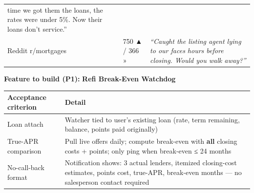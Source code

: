 \documentclass[
  10pt,
]{article}
\let\origtexttt\texttt
\renewcommand{\texttt}[1]{\origtexttt{\seqsplit{#1}}}
\begin{document}
\begin{longtable}[]{@{}llll@{}}
\begin{minipage}[t]{0.44\columnwidth}
{time we got them the loans, the rates were under 5\%. Now their loans don't service.''}\strut
\end{minipage}\tabularnewline
\begin{minipage}[t]{0.20\columnwidth}\raggedright
Reddit r/mortgages\strut
\end{minipage} & \begin{minipage}[t]{0.14\columnwidth}\raggedright
\texttt{1so6v60}\strut
\end{minipage} & \begin{minipage}[t]{0.10\columnwidth}\raggedright
750 ▲ / 366 »\strut
\end{minipage} & \begin{minipage}[t]{0.44\columnwidth}\raggedright
\emph{``Caught the listing agent lying to our faces hours before closing. Would you walk
away?''}\strut
\end{minipage}\tabularnewline
\bottomrule
\end{longtable}

\textbf{Feature to build (P1):} \textbf{Refi Break-Even Watchdog}

\begin{longtable}[]{@{}ll@{}}
\toprule
\begin{minipage}[b]{0.47\columnwidth}\raggedright
Acceptance criterion\strut
\end{minipage} & \begin{minipage}[b]{0.47\columnwidth}\raggedright
Detail\strut
\end{minipage}\tabularnewline
\midrule
\endhead
\begin{minipage}[t]{0.47\columnwidth}\raggedright
Loan attach\strut
\end{minipage} & \begin{minipage}[t]{0.47\columnwidth}\raggedright
Watcher tied to user's existing loan (rate, term remaining, balance, points paid originally)\strut
\end{minipage}\tabularnewline
\begin{minipage}[t]{0.47\columnwidth}\raggedright
True-APR comparison\strut
\end{minipage} & \begin{minipage}[t]{0.47\columnwidth}\raggedright
Pull live offers daily; compute break-even with \textbf{all} closing costs + points; only ping when
break-even ≤ 24 months\strut
\end{minipage}\tabularnewline
\begin{minipage}[t]{0.47\columnwidth}\raggedright
No-call-back format\strut
\end{minipage} & \begin{minipage}[t]{0.47\columnwidth}\raggedright
Notification shows: 3 actual lenders, itemized closing-cost estimates, points cost, true-APR,
break-even months --- no salesperson contact required\strut
\end{minipage}\tabularnewline
\bottomrule
\end{longtable}
\end{document}

